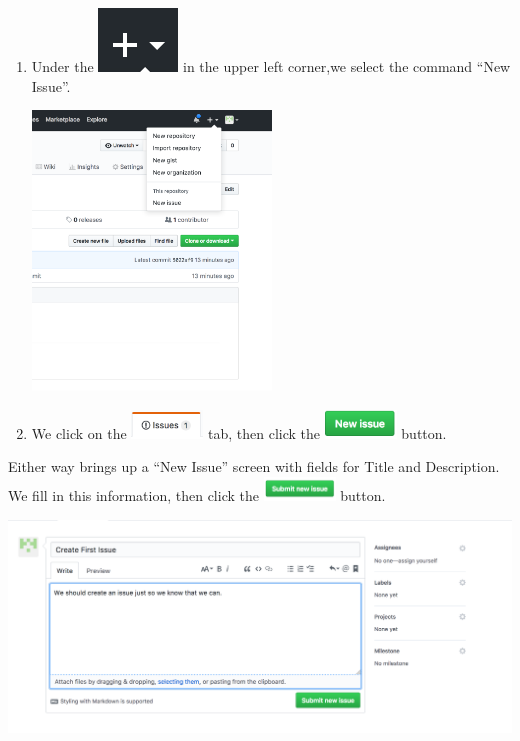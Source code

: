 \documentclass[11pt]{article}
\begin{document}
\begin{enumerate}

\item Under the \includegraphics{PlusMenu}
 in the upper left corner,we select the command ``New Issue''. \\

\begin{center}
\includegraphics[width=0.5\textwidth]{NewIssueMenu}
\end{center}

\item We click on the \includegraphics[width=0.75in]{IssuesLink} tab, then click the \includegraphics[width=0.75in]{NewIssueButton} button. 

\end{enumerate} 

Either way brings up a ``New Issue'' screen with fields for Title and Description. We fill in this information, then click the \includegraphics[width=0.75in]{SubmitNewIssue} button. 

\begin{center}
\includegraphics[width=\textwidth]{CreatingAnIssue}
\end{center}
\end{document}
